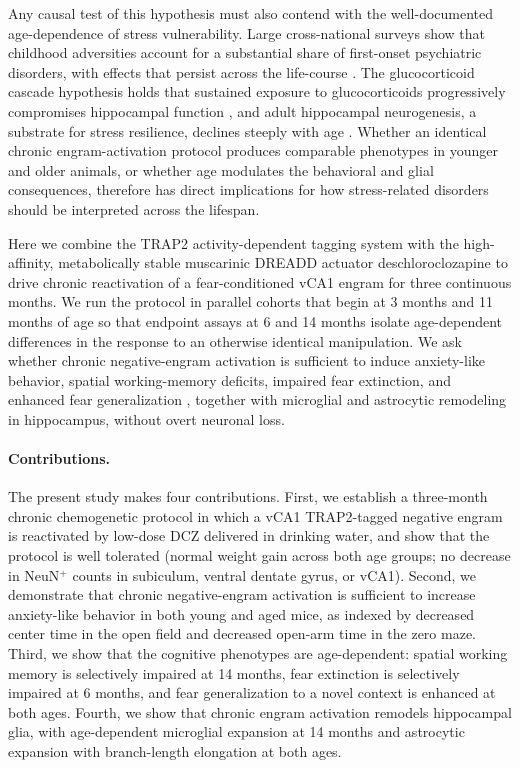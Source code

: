 \documentclass[11pt]{article}
\begin{document}
Any causal test of this hypothesis must also contend with the well-documented age-dependence of stress vulnerability. Large cross-national surveys show that childhood adversities account for a substantial share of first-onset psychiatric disorders, with effects that persist across the life-course \citep{kessler2010childhood}. The glucocorticoid cascade hypothesis holds that sustained exposure to glucocorticoids progressively compromises hippocampal function \citep{sapolsky1986glucocorticoid}, and adult hippocampal neurogenesis, a substrate for stress resilience, declines steeply with age \citep{klempin2007neurogenesis}. Whether an identical chronic engram-activation protocol produces comparable phenotypes in younger and older animals, or whether age modulates the behavioral and glial consequences, therefore has direct implications for how stress-related disorders should be interpreted across the lifespan.

Here we combine the TRAP2 activity-dependent tagging system \citep{denardo2019temporal} with the high-affinity, metabolically stable muscarinic DREADD actuator deschloroclozapine \citep{nagai2020dcz,roth2016dreadds} to drive chronic reactivation of a fear-conditioned vCA1 engram for three continuous months. We run the protocol in parallel cohorts that begin at 3 months and 11 months of age so that endpoint assays at 6 and 14 months isolate age-dependent differences in the response to an otherwise identical manipulation. We ask whether chronic negative-engram activation is sufficient to induce anxiety-like behavior, spatial working-memory deficits, impaired fear extinction, and enhanced fear generalization \citep{maren2013contextual,tovote2015circuits}, together with microglial and astrocytic remodeling in hippocampus, without overt neuronal loss.

\paragraph{Contributions.} The present study makes four contributions. First, we establish a three-month chronic chemogenetic protocol in which a vCA1 TRAP2-tagged negative engram is reactivated by low-dose DCZ delivered in drinking water, and show that the protocol is well tolerated (normal weight gain across both age groups; no decrease in NeuN$^{+}$ counts in subiculum, ventral dentate gyrus, or vCA1). Second, we demonstrate that chronic negative-engram activation is sufficient to increase anxiety-like behavior in both young and aged mice, as indexed by decreased center time in the open field and decreased open-arm time in the zero maze. Third, we show that the cognitive phenotypes are age-dependent: spatial working memory is selectively impaired at 14 months, fear extinction is selectively impaired at 6 months, and fear generalization to a novel context is enhanced at both ages. Fourth, we show that chronic engram activation remodels hippocampal glia, with age-dependent microglial expansion at 14 months and astrocytic expansion with branch-length elongation at both ages.
\end{document}
